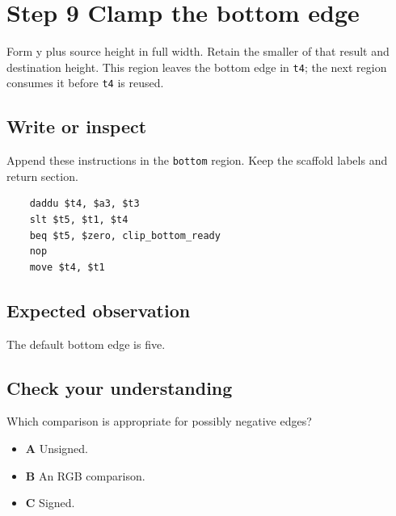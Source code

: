 \section{Step 9 Clamp the bottom edge}\label{blit-s09}

Form y plus source height in full width. Retain the smaller of that result and destination height. This region leaves the bottom edge in \texttt{t4}; the next region consumes it before \texttt{t4} is reused.

\subsection{Write or inspect}
Append these instructions in the \texttt{bottom} region. Keep the scaffold labels and return section.

\begin{verbatim}
    daddu $t4, $a3, $t3
    slt $t5, $t1, $t4
    beq $t5, $zero, clip_bottom_ready
    nop
    move $t4, $t1
\end{verbatim}

\subsection{Expected observation}
The default bottom edge is five.

\subsection{Check your understanding}
Which comparison is appropriate for possibly negative edges?

\begin{itemize}
  \item \textbf{A} Unsigned.
  \item \textbf{B} An RGB comparison.
  \item \textbf{C} Signed.
\end{itemize}
